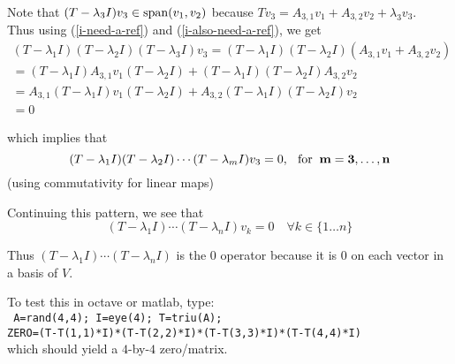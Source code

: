 \begin{prf}
  Note that $(T-\lambda_3 I) v_3 \in \operatorname{span} (v_1, v_2)$ because $T v_3 = A_{3,1} v_1 +   A_{3,2} v_2 + \lambda_3 v_3$. \\
  Thus using (\ref{i-need-a-ref}) and (\ref{i-also-need-a-ref}), we get
  \begin{equation}
    \begin{aligned}
      (T- \lambda_1 I) (T- \lambda_2 I) (T- \lambda_3 I)v_3 
      =(T- \lambda_1 I) (T- \lambda_2 I)(A_{3,1} v_1 +   A_{3,2} v_2)  \\
      = (T- \lambda_1 I)A_{3,1} v_1(T- \lambda_2 I)+(T- \lambda_1 I)(T- \lambda_2 I)A_{3,2} v_2 \\
      = A_{3,1}(T- \lambda_1 I) v_1(T- \lambda_2 I)+A_{3,2}(T- \lambda_1 I)(T- \lambda_2 I) v_2 \\
      = 0
    \end{aligned}
  \end{equation}
  
  which implies that
  \begin{equation}
    (T-\lambda_1 I) (T-\lambda_2 I) \cdots (T-\lambda_m I) v_3= 0, \;\;\, \text{for}\;\; \mathbf{m = 3, \ldots, n}
  \end{equation}
  (using commutativity for linear maps)
  \bigbreak
  
  Continuing this pattern, we see that
  \begin{equation}
    (T-\lambda_1 I) \cdots (T- \lambda_n I) v_k = 0 \quad \forall k \in \{ 1\ldots n \}
  \end{equation}
  
  Thus $(T-\lambda_1 I) \cdots (T- \lambda_n I)$ is the $0$ operator because it is $0$ on each vector in a basis of $V$.
\end{prf}

\begin{example-non}
  To test this  in octave or matlab, type: \\
  \texttt{
    A=rand(4,4); I=eye(4); T=triu(A); \\
    ZERO=(T-T(1,1)*I)*(T-T(2,2)*I)*(T-T(3,3)*I)*(T-T(4,4)*I) 
  } \\
  which should yield a $4$-by-$4$ zero\-/matrix. 
\end{example-non}

